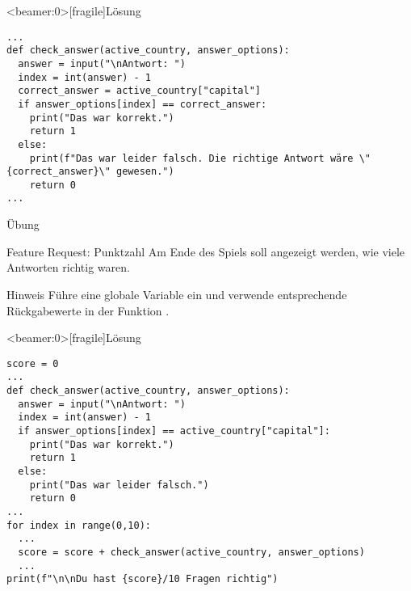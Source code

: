 \begin{frame}<beamer:0>[fragile]{Lösung}

\begin{solutionblock}{}
\begin{verbatim}
...
def check_answer(active_country, answer_options):
  answer = input("\nAntwort: ")
  index = int(answer) - 1
  correct_answer = active_country["capital"]
  if answer_options[index] == correct_answer:
    print("Das war korrekt.")
    return 1
  else:
    print(f"Das war leider falsch. Die richtige Antwort wäre \"{correct_answer}\" gewesen.")
    return 0
...
\end{verbatim}
\end{solutionblock}
\end{frame}

\begin{frame}{Übung}
\begin{block}{Feature Request: Punktzahl}
\vspace{2pt}
Am Ende des Spiels soll angezeigt werden, wie viele Antworten richtig waren. 
\end{block}

\pause 
\vspace{12pt}
\begin{exampleblock}{Hinweis}
\vspace{2pt}
Führe eine globale Variable  ein und verwende entsprechende Rückgabewerte in der Funktion .	
\end{exampleblock}



\end{frame}

\begin{frame}<beamer:0>[fragile]{Lösung}
	
\begin{solutionblock}{}
\begin{verbatim}
score = 0
...
def check_answer(active_country, answer_options):
  answer = input("\nAntwort: ")
  index = int(answer) - 1
  if answer_options[index] == active_country["capital"]:
    print("Das war korrekt.")
    return 1
  else:
    print("Das war leider falsch.")
    return 0
...
for index in range(0,10): 
  ...
  score = score + check_answer(active_country, answer_options)
  ...
print(f"\n\nDu hast {score}/10 Fragen richtig")
\end{verbatim}
\end{solutionblock}
\end{frame}







